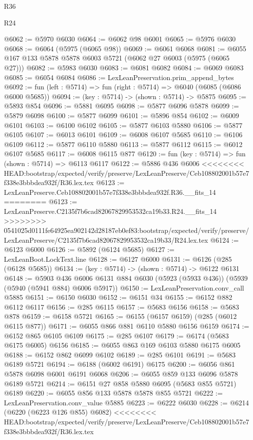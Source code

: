 \begin{lexlean}{R36}
\begin{lexlean}{R24}
\begin{coremodule}
{{{{{{{{{{{{{{{{{{{{{{{{{{{{{{{{{{{{{{{{{{{{{{{{{{{{{{{{{{{{{{{{{{{{{{{{{{{{{{{{{{{{{{{{{{{{{{{{{{{{{{{{{{{{{{{{{{{{{{{{{{{{{{{{{{{{{{{{{{{{{{{{{{{{{{{{{{{{{{{{{{{{{{{{{{{{{{{{{{{{{{{{{{{{{{{{{{{@6062 := @5970 @6030
@6064 := @6062 @98 @6001
@6065 := @5976 @6030
@6068 := @6064 (@5975 (@6065 @98))
@6069 := @6061 @6068
@6081 := @6055 @167 @133 @5878 @5878 @6003 @5721 (@6062 @27 @6003 (@5975 (@6065 @27)))
@6082 := @5983 @6030
@6083 := @6081 @6082
@6084 := @6069 @6083
@6085 := @6054 @6084
@6086 := LexLeanPreservation.prim_append_bytes
@6092 := fun (left : @5714) => fun (right : @5714) => @6040 (@6085 (@6086 @6000 @5685))
@6094 := (key : @5714) -> (shown : @5714) -> @5875
@6095 := @5893 @854
@6096 := @5881 @6095
@6098 := @5877 @6096 @5878
@6099 := @5879 @6098
@6100 := @5877 @6099
@6101 := @5896 @854
@6102 := @6009 @6101
@6103 := @6100 @6102
@6105 := @5877 @6103 @5880
@6106 := @5877 @6105
@6107 := @6013 @6101
@6109 := @6008 @6107 @5685
@6110 := @6106 @6109
@6112 := @5877 @6110 @5880
@6113 := @5877 @6112
@6115 := @6012 @6107 @5685
@6117 := @6008 @6115 @877
@6120 := fun (key : @5714) => fun (shown : @5714) => @6113 @6117
@6122 := @5886 @436 @6006
<<<<<<<< HEAD:bootstrap/expected/verify/preserve/LexLeanPreserve/Ceb108802001b57e7f338e3bbbdea932f/R36.lex.tex
@6123 := LexLeanPreserve.Ceb108802001b57e7f338e3bbbdea932f.R36.__fits_14
========
@6123 := LexLeanPreserve.C2135f7b6cad82067829953532ca19b33.R24.__fits_14
>>>>>>>> 0541025d0111fe64925ea902142d28187eb0ef83:bootstrap/expected/verify/preserve/LexLeanPreserve/C2135f7b6cad82067829953532ca19b33/R24.lex.tex
@6124 := @6123 @6000
@6126 := @5892 (@6124 @5685)
@6127 := LexLeanBoot.LockText.line
@6128 := @6127 @6000
@6131 := @6126 (@285 (@6128 @5685))
@6134 := (key : @5714) -> (shown : @5714) -> @6122 @6131
@6148 := @5903
    @436
    @6006
    @6131
    @884
    @6030
    (@5923 (@5933 @436))
    (@5939 (@5940 (@5941 @884) @6006 @5917))
@6150 := LexLeanPreservation.conv_call @5885
@6151 := @6150 @6030
@6152 := @6151 @34
@6155 := @6152 @882 @6112 @6117
@6156 := @285 @6115
@6157 := @5683 @6156
@6158 := @5683 @878
@6159 := @6158 @5721
@6165 := @6155 (@6157 @6159) (@285 (@6012 @6115 @877))
@6171 := @6055 @866 @881 @6110 @5880 @6156 @6159
@6174 := @6152 @865 @6105 @6109
@6175 := @285 @6107
@6179 := @6174 (@5683 @6175 @6005) @6156
@6185 := @6055 @863 @169 @6103 @5880 @6175 @6005
@6188 := @6152 @862 @6099 @6102
@6189 := @285 @6101
@6191 := @5683 @6189 @5721
@6194 := @6188 (@6002 @6191) @6175
@6200 := @6056 @861 @5878 @6098 @6001 @6191 @6068
@6206 := @6055 @859 @133 @6096 @5878 @6189 @5721
@6214 := @6151 @27 @858 @5880 @6095 (@5683 @855 @5721) @6189
@6220 := @6055 @856 @133 @5878 @5878 @855 @5721
@6222 := LexLeanPreservation.conv_value @5885
@6223 := @6222 @6030
@6228 := @6214 (@6220 (@6223 @126 @855) @6082)
<<<<<<<< HEAD:bootstrap/expected/verify/preserve/LexLeanPreserve/Ceb108802001b57e7f338e3bbbdea932f/R36.lex.tex
}}}}}}}}}}}}}}}}}}}}}}}}}}}}}}}}}}}}}}}}}}}}}}}}}}}}}}}}}}}}}}}}}}}}}}}}}}}}}}}}}}}}}}}}}}}}}}}}}}}}}}}}}}}}}}}}}}}}}}}}}}}}}}}}}}}}}}}}}}}}}}}}}}}}}}}}}}}}}}}}}}}}}}}}}}}}}}}}}}}}}}}}}}}}}}}}}}}
\end{coremodule}
\end{lexlean}
\end{lexlean}
